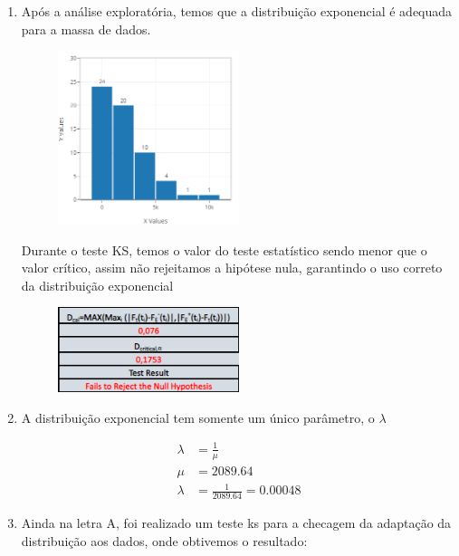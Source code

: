 \documentclass{article}
\begin{document}
\begin{enumerate}[label=(\alph*)]
    \item Após a análise exploratória, temos que a distribuição exponencial é adequada para a massa de dados.

    \begin{figure}[H]
        \centering
        \includegraphics[width=0.5\textwidth]{histograma.png} 
        \label{fig:q10example}
    \end{figure}

    Durante o teste KS, temos o valor do teste estatístico sendo menor que o valor crítico, assim não rejeitamos a hipótese nula, garantindo o uso correto da distribuição exponencial

    \begin{figure}[H]
        \centering
        \includegraphics[width=0.5\textwidth]{ks_10.png} 
        \label{fig:q101example}
    \end{figure}

    \item A distribuição exponencial tem somente um único parâmetro, o $\lambda$

\begin{align*}
    \lambda &= \frac{1}{\mu} \\
    \mu &= 2089.64 \\
    \lambda &= \frac{1}{2089.64} = 0.00048
\end{align*}

\item Ainda na letra A, foi realizado um teste ks para a checagem da adaptação da distribuição aos dados, onde obtivemos o resultado:


\end{enumerate}
\end{document}
